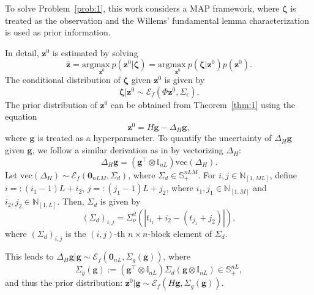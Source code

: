 \documentclass{ifacconf}
\newcommand{\vect}[1]{\mathrm{vec}\left(#1\right)}
\newcommand{\ellip}[1]{\mathcal{E}_f\left(#1\right)}
\begin{document}
To solve Problem~\ref{prob:1}, this work considers a MAP framework, where $\boldsymbol{\zeta}$ is treated as the observation and the Willems' fundamental lemma characterization is used as prior information.

In detail, $\mathbf{z}^0$ is estimated by solving
\begin{equation}
    \hat{\mathbf{z}}=\mathrm{arg}\underset{\mathbf{z}^0}{\mathrm{max}}\ p\left(\mathbf{z}^0|\boldsymbol{\zeta}\right)=\mathrm{arg}\underset{\mathbf{z}^0}{\mathrm{max}}\ p\left(\boldsymbol{\zeta}|\mathbf{z}^0\right)p\left(\mathbf{z}^0\right).
    \label{eq:maporigin}
\end{equation}
The conditional distribution of $\boldsymbol{\zeta}$ given $\mathbf{z}^0$ is given by 
$$\boldsymbol{\zeta}|\mathbf{z}^0\sim\ellip{\Phi\mathbf{z}^0,\Sigma_\epsilon}.$$
The prior distribution of $\mathbf{z}^0$ can be obtained from Theorem~\ref{thm:1} using the equation $$\mathbf{z}^0=H\mathbf{g}-\Delta_H\mathbf{g},$$
where $\mathbf{g}$ is treated as a hyperparameter. To quantify the uncertainty of $\Delta_H\mathbf{g}$ given $\mathbf{g}$, we follow a similar derivation as in \cite{yin2020maximum} by vectorizing $\Delta_H$: 
$$\Delta_H\mathbf{g}=\left(\mathbf{g}^\top\otimes \mathbb{I}_{nL}\right)\vect{\Delta_H}.$$
Let $\vect{\Delta_H}\sim\ellip{\mathbf{0}_{nLM},\Sigma_d}$,
where $\Sigma_d\in\mathbb{S}_+^{nLM}$. For $i,j\in\mathbb{N}_{[1,ML]}$, define $i=:(i_1-1)L+i_2$, $j=:(j_1-1)L+j_2$, where  $i_1,j_1\in\mathbb{N}_{[1,M]}$ and $i_2,j_2\in\mathbb{N}_{[1,L]}$. Then, $\Sigma_d$ is given by
\begin{equation}
    \left(\Sigma_d\right)_{i,j}=\Sigma_\nu^d(|t_{i_1}+i_2-(t_{j_1}+j_2)|),
    \label{eq:sigd}
\end{equation}
where $\left(\Sigma_d\right)_{i,j}$ is the $(i,j)$-th $n\times n$-block element of $\Sigma_d$. 

This leads to $\Delta_H\mathbf{g}|\mathbf{g}\sim\ellip{\mathbf{0}_{nL},\Sigma_g(\mathbf{g})}$, where
\begin{equation}
    \Sigma_g(\mathbf{g}):=\left(\mathbf{g}^\top\otimes \mathbb{I}_{nL}\right)\Sigma_d\left(\mathbf{g}\otimes \mathbb{I}_{nL}\right)\in\mathbb{S}_+^{nL},
    \label{eq:sigg}
\end{equation}
and thus the prior distribution: $\mathbf{z}^0|\mathbf{g}\sim\ellip{H\mathbf{g},\Sigma_g(\mathbf{g})}$.
\end{document}
